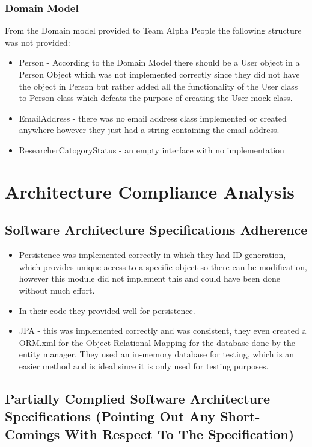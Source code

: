 \documentclass{article}
\begin{document}
	\subsubsection{Domain Model}
	From the Domain model provided to Team Alpha People the following structure was not provided:
	\begin{itemize}
		\item Person - According to the Domain Model there should be a User object in a Person Object which was not implemented correctly since they did not have the object in Person but rather added all the functionality of the User class to Person class which defeats the purpose of creating the User mock class.
		\item EmailAddress - there was no email address class implemented or created anywhere however they just had a string containing the email address.
		\item ResearcherCatogoryStatus - an empty interface with no implementation
	 \end{itemize}

\section{Architecture Compliance Analysis}
	\subsection{Software Architecture Specifications Adherence}
	\begin{itemize}

	\item Persistence was implemented correctly in which they had ID generation, which provides unique access to a specific object so there can be modification, however this module did not implement this and could have been done without much effort. 

			\item In their code they provided well for persistence.
		\item JPA - this was implemented correctly and was consistent, they even created a ORM.xml for the Object Relational Mapping for the database done by the entity manager. They used an in-memory database for testing, which is an easier method and is ideal since it is only used for testing purposes.
	\end{itemize}

	\subsection{Partially Complied Software Architecture Specifications (Pointing Out Any Short-Comings With Respect To The Specification)}
\end{document}

